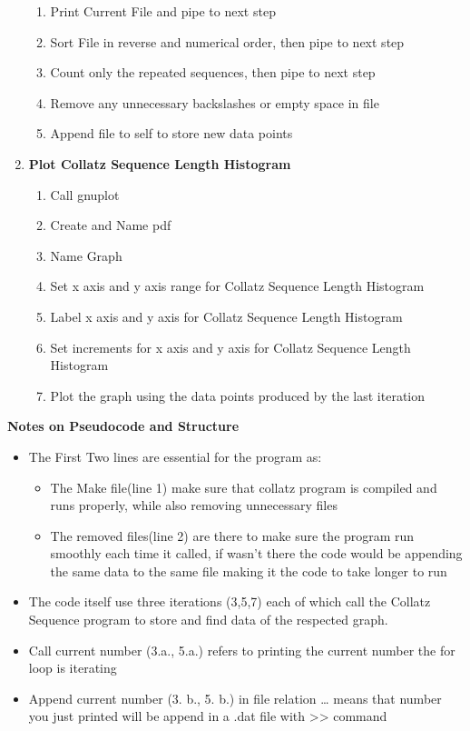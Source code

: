 \documentclass[11pt]{article} %
\begin{document}
\begin{flushleft}
\begin{enumerate}
\begin{enumerate}
\item Print Current File and pipe to next step
\item Sort File in reverse and numerical order, then pipe to next step
\item Count only the repeated sequences, then pipe to next step
\item Remove any unnecessary backslashes or empty space in file
\item Append file to self to store new data points
\end{enumerate}
\item \small {\textbf{Plot Collatz Sequence Length Histogram}}
\begin{enumerate}
\item Call gnuplot
\item Create and Name pdf
\item Name Graph
\item Set x axis and y axis range for Collatz Sequence Length Histogram
\item Label x axis and y axis for Collatz Sequence Length Histogram
\item Set increments for x axis and y axis for Collatz Sequence Length Histogram
\item Plot the graph using the data points produced by the last iteration
\end{enumerate}
\end{enumerate}
\small{\textbf{Notes on Pseudocode and Structure}}
\begin{itemize}
\item The First Two lines are essential for the program as:
    \begin{itemize}
    \item The Make file(line 1) make sure that collatz program is compiled and runs properly, while also removing unnecessary files
    \item The removed files(line 2) are there to make sure the program run smoothly each time it called, if wasn’t there the code would be appending the same data to the same file making it the code to take longer to run
    \end{itemize} 
\item The code itself use three iterations (3,5,7) each of which call the Collatz Sequence program to store and find data of the respected graph. 
\item Call current number (3.a., 5.a.) refers to printing the current number the for loop is iterating
\item Append current number (3. b., 5. b.) in file relation … means that number you just printed will be append in a .dat file with >> command

\end{itemize}
\end{flushleft}
\end{document}
